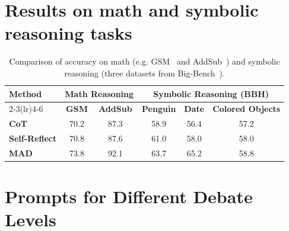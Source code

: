 \clearpage

\section{Results on math and symbolic reasoning tasks}
\label{app:math_symbolic_results}

\begin{table}[!ht]
\centering
\begin{tabular}{l cc ccc}
\toprule
\multirow{2}{*}{\bf Method} & \multicolumn{2}{c}{\bf Math Reasoning	} & \multicolumn{3}{c}{\bf Symbolic Reasoning (BBH)}\\
\cmidrule(lr){2-3}\cmidrule(lr){4-6}
& \bf GSM & \bf AddSub & \bf Penguin & \bf Date & \bf Colored Objects \\
\midrule
\bf CoT          & 70.2 & 87.3 & 58.9 & 56.4 & 57.2 \\
\bf Self-Reflect & 70.8 & 87.6 & 61.0 & 58.0 & 58.0 \\
\bf MAD          & 73.8 & 92.1 & 63.7 & 65.2 & 58.8 \\
\bottomrule
\end{tabular}
\caption{Comparison of accuracy on math (e.g. GSM~\citep{cobbe2021training} and AddSub~\citep{hosseini2014learning}) and symbolic reasoning (three datasets from Big-Bench~\citep{srivastava2023beyond,suzgun2023challenging}).}
\label{tab:math_symbolic_results}
\end{table}

\section{Prompts for Different Debate Levels}

